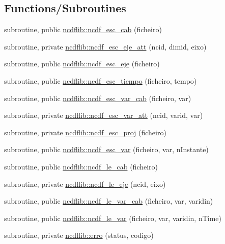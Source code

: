 \subsection*{Functions/\+Subroutines}
\begin{DoxyCompactItemize}
\item 
subroutine, public \mbox{\hyperlink{namespacencdflib_a513dad5b1d92a6ff5006b8c276dc1076}{ncdflib\+::ncdf\+\_\+esc\+\_\+cab}} (ficheiro)
\item 
subroutine, private \mbox{\hyperlink{namespacencdflib_a9357ce05485fdb83f341289a30c10ce1}{ncdflib\+::ncdf\+\_\+esc\+\_\+eje\+\_\+att}} (ncid, dimid, eixo)
\item 
subroutine, public \mbox{\hyperlink{namespacencdflib_a15543143f5feb2ff655f4b60aeae5354}{ncdflib\+::ncdf\+\_\+esc\+\_\+eje}} (ficheiro)
\item 
subroutine, public \mbox{\hyperlink{namespacencdflib_a70418482c5ffef91933942850702610f}{ncdflib\+::ncdf\+\_\+esc\+\_\+tiempo}} (ficheiro, tempo)
\item 
subroutine, public \mbox{\hyperlink{namespacencdflib_a5a3613be95873626820a361a60fb2876}{ncdflib\+::ncdf\+\_\+esc\+\_\+var\+\_\+cab}} (ficheiro, var)
\item 
subroutine, private \mbox{\hyperlink{namespacencdflib_acbe4ff328732b4674512c190b8c2d5b5}{ncdflib\+::ncdf\+\_\+esc\+\_\+var\+\_\+att}} (ncid, varid, var)
\item 
subroutine, private \mbox{\hyperlink{namespacencdflib_ab26646e33f23098c9a84e29cc33af7bc}{ncdflib\+::ncdf\+\_\+esc\+\_\+proj}} (ficheiro)
\item 
subroutine, public \mbox{\hyperlink{namespacencdflib_a948c992e922b3d6f18e5f3bbb27b5266}{ncdflib\+::ncdf\+\_\+esc\+\_\+var}} (ficheiro, var, n\+Instante)
\item 
subroutine, public \mbox{\hyperlink{namespacencdflib_a92c4f01a8b6a24a838eab2dc25d7d062}{ncdflib\+::ncdf\+\_\+le\+\_\+cab}} (ficheiro)
\item 
subroutine, private \mbox{\hyperlink{namespacencdflib_a6381f85426e3ba879b031f6feae929c1}{ncdflib\+::ncdf\+\_\+le\+\_\+eje}} (ncid, eixo)
\item 
subroutine, public \mbox{\hyperlink{namespacencdflib_add9998fa9d635bb8d35f562f55be98a3}{ncdflib\+::ncdf\+\_\+le\+\_\+var\+\_\+cab}} (ficheiro, var, varidin)
\item 
subroutine, public \mbox{\hyperlink{namespacencdflib_ac0842e227620b638b2a5474d6e1b441f}{ncdflib\+::ncdf\+\_\+le\+\_\+var}} (ficheiro, var, varidin, n\+Time)
\item 
subroutine, private \mbox{\hyperlink{namespacencdflib_a67d87694106e0b29a70cb174d730d570}{ncdflib\+::erro}} (status, codigo)
\end{DoxyCompactItemize}
